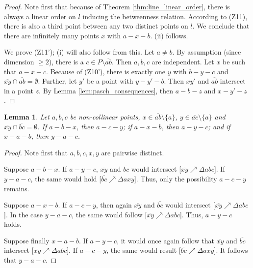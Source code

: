 \documentclass[11pt,a4paper]{article}
\newcommand{\betw}[3]{#1 - #2 - #3}
\newcommand{\lineab}[1]{\overline{#1}}
\newtheorem{lemma}[theorem]{Lemma}
\begin{document}
\begin{proof}
Note first that because of Theorem \ref{thm:line_linear_order}, there is always a linear order on $l$ inducing the betweenness relation. According to (Z11), there is also a third point between any two distinct points on $l$. We conclude that there are infinitely many points $x$ with $\betw{a}{x}{b}$. (ii) follows.

We prove (Z11'); (i) will also follow from this. Let $a \neq b$. By assumption (since dimension $\ge 2$), there is a $c \in P \setminus \lineab{ab}$. Then $a, b, c$ are independent. Let $x$ be such that $\betw{a}{x}{c}$. Because of (Z10'), there is exactly one $y$ with $\betw{b}{y}{c}$ and $\lineab{xy} \cap \lineab{ab} = \emptyset$. Further, let $y'$ be a point with $\betw{y}{y'}{b}$. Then $\lineab{xy'}$ and $\lineab{ab}$ intersect in a point $z$. By Lemma \ref{lem:pasch_consequences}, then $\betw{a}{b}{z}$ and $\betw{x}{y'}{z}$.
\end{proof}

\begin{lemma} \label{lem:pasch_variant}
Let $a, b, c$ be non-collinear points, $x \in \lineab{ab} \setminus \{a\}$, $y \in \lineab{ac} \setminus \{a\}$ and $\lineab{xy} \cap \lineab{bc} = \emptyset$. If $\betw{a}{b}{x}$, then $\betw{a}{c}{y}$; if $\betw{a}{x}{b}$, then $\betw{a}{y}{c}$; and if $\betw{x}{a}{b}$, then $\betw{y}{a}{c}$.
\end{lemma}

\begin{proof}
Note first that $a, b, c, x, y$ are pairwise distinct.

Suppose $\betw{a}{b}{x}$. If $\betw{a}{y}{c}$, $\lineab{xy}$ and $\lineab{bc}$ would intersect [$\lineab{xy} \nearrow \Delta a b c$]. If $\betw{y}{a}{c}$, the same would hold [$\lineab{bc} \nearrow \Delta a x y$]. Thus, only the possibility $\betw{a}{c}{y}$ remains.

Suppose $\betw{a}{x}{b}$. If $\betw{a}{c}{y}$, then again $\lineab{xy}$ and $\lineab{bc}$ would intersect [$\lineab{xy} \nearrow \Delta a b c$]. In the case $\betw{y}{a}{c}$, the same would follow [$\lineab{xy} \nearrow \Delta a b c$]. Thus, $\betw{a}{y}{c}$ holds.

Suppose finally $\betw{x}{a}{b}$. If $\betw{a}{y}{c}$, it would once again follow that $\lineab{xy}$ and $\lineab{bc}$ intersect [$\lineab{xy} \nearrow \Delta a b c$]. If $\betw{a}{c}{y}$, the same would result [$\lineab{bc} \nearrow \Delta a x y$]. It follows that $\betw{y}{a}{c}$.
\end{proof}
\end{document}
